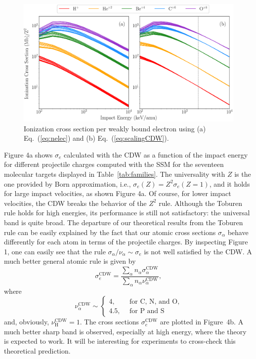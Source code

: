 \documentclass[preprint,12pt]{article}
\begin{document}
\begin{figure}[t!]
\includegraphics[width=\textwidth]{figuras/molscaling85.eps}
\caption{Ionization cross section per weakly bound electron using
(a) Eq.~(\ref{eq:nelec}) and (b) Eq.~(\ref{eq:scalingCDW}).}
\label{fig:newscaling}
\end{figure}
Figure 4a shows $\sigma_{e}$ calculated with the CDW as a function of 
the impact energy for different projectile charges computed with the 
SSM for the seventeen molecular targets displayed in 
Table~\ref{tab:families}. The universality with $Z$ is the one provided 
by Born approximation, i.e., $\sigma _{e}(Z)=Z^{2}\sigma_{e}(Z=1)$, 
and it holds for large impact velocities, as shown Figure 4a.
Of course, for lower impact velocities, the CDW breaks the behavior of 
the $Z^{2}$ rule. Although the Toburen rule holds for high energies, 
its performance is still not satisfactory: the universal band is quite 
broad. The departure of our theoretical 
results from the Toburen rule can be easily explained by the fact that 
our atomic cross sections $\sigma_{\alpha}$ behave differently for 
each atom in terms of the projectile charges. By inspecting Figure 1, 
one can easily see that the rule $\sigma_{\alpha}/\nu_{\alpha}\sim
\sigma_{e}$ is not well satisfied by the CDW. A much better general 
atomic rule is given by
\begin{equation}
\sigma_{e}^{\text{CDW}}=\frac{\sum\limits_{\alpha}
n_{\alpha}\sigma_{\alpha}^{\text{CDW}}}{\sum\limits_{\alpha}n_{\alpha}
\nu_{\alpha}^{\text{CDW}}},
\label{32} 
\end{equation}
where 
\begin{equation}
\nu_{\alpha }^{\text{CDW}} \sim\left\{ 
\begin{array}{ll}
4,\ \ \  & \text{for C, N, and O,} \\ 
4.5,\ \  & \text{for P and S}
\end{array}
\right. 
\label{eq:scalingCDW}
\end{equation}
and, obviously, $\nu_{\text{H}}^{\text{CDW}}=1$. The cross sections 
$\sigma_{e}^{\text{CDW}}$ are plotted in Figure~4b. A much better sharp 
band is observed, especially at high energy, where the theory is 
expected to work. It will be interesting for experiments to cross-check 
this theoretical prediction.
\end{document}
